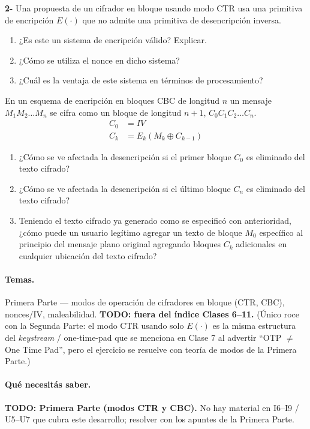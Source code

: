 \begin{consigna}
\textbf{2-} Una propuesta de un cifrador en bloque usando modo CTR usa una primitiva de
encripción $E(\cdot)$ que no admite una primitiva de desencripción inversa.
\begin{enumerate}
\item[(a)] ¿Es este un sistema de encripción válido? Explicar.
\item[(b)] ¿Cómo se utiliza el nonce en dicho sistema?
\item[(c)] ¿Cuál es la ventaja de este sistema en términos de procesamiento?
\end{enumerate}

En un esquema de encripción en bloques CBC de longitud $n$ un mensaje $M_1 M_2 \ldots M_n$ se
cifra como un bloque de longitud $n{+}1$, $C_0 C_1 C_2 \ldots C_n$.
\begin{align*}
C_0 &= IV \\
C_k &= E_k(M_k \oplus C_{k-1})
\end{align*}
\begin{enumerate}
\item[(a)] ¿Cómo se ve afectada la desencripción si el primer bloque $C_0$ es eliminado del texto cifrado?
\item[(b)] ¿Cómo se ve afectada la desencripción si el último bloque $C_n$ es eliminado del texto cifrado?
\item[(c)] Teniendo el texto cifrado ya generado como se especificó con anterioridad, ¿cómo puede un usuario legítimo agregar un texto de bloque $M_0$ específico al principio del mensaje plano original agregando bloques $C_k$ adicionales en cualquier ubicación del texto cifrado?
\end{enumerate}
\end{consigna}

\paragraph{Temas.}
Primera Parte — modos de operación de cifradores en bloque (CTR, CBC), nonces/IV, maleabilidad.
\textbf{TODO: fuera del índice Clases 6--11.} (Único roce con la Segunda Parte: el modo CTR
usando solo $E(\cdot)$ es la misma estructura del \emph{keystream} / one-time-pad que se menciona
en Clase 7 al advertir ``OTP $\ne$ One Time Pad'', pero el ejercicio se resuelve con teoría de
modos de la Primera Parte.)

\paragraph{Qué necesitás saber.}
\textbf{TODO: Primera Parte (modos CTR y CBC).} No hay material en I6--I9 / U5--U7 que cubra
este desarrollo; resolver con los apuntes de la Primera Parte.

